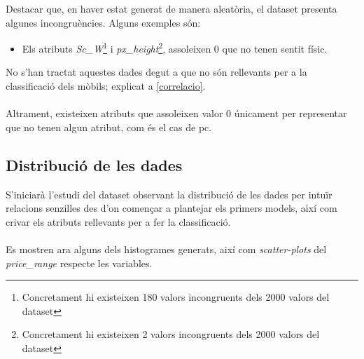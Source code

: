 \documentclass[a4paper, 11pt]{article}
\begin{document}
Destacar que, en haver estat generat de manera aleatòria, el dataset presenta algunes incongruències. Alguns exemples són:
\begin{itemize}
    \item Els atributs \textit{Sc\_W}\footnote{Concretament hi existeixen 180 valors incongruents dels 2000 valors del dataset} i \textit{px\_height}\footnote{Concretament hi existeixen 2 valors incongruents dels 2000 valors del dataset}, assoleixen 0 que no tenen sentit físic.
\end{itemize}
No s'han tractat aquestes dades degut a que no són rellevants per a la classificació dels mòbils; explicat a \textcolor{blue}{\ref{correlacio}}.\\\\
Altrament, existeixen atributs que assoleixen valor 0 únicament per representar que no tenen algun atribut, com és el cas de pc. 
\newpage
\subsection{Distribució de les dades}
S'iniciarà  l'estudi del dataset observant la distribució de les dades per intuïr relacions senzilles des d'on començar a plantejar els primers models, així com crivar els atributs rellevants per a fer la classificació.\\\\
Es mostren ara alguns dels histogrames generats, així com \textit{scatter-plots} del \textit{price\_range} respecte les variables. 
\end{document}
